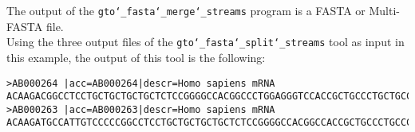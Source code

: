 The output of the \texttt{gto\char`_fasta\char`_merge\char`_streams} program is a FASTA or Multi-FASTA file.\\
Using the three output files of the \texttt{gto\char`_fasta\char`_split\char`_streams} tool as input in this example, the output of this tool is the following:
\begin{lstlisting}
>AB000264 |acc=AB000264|descr=Homo sapiens mRNA 
ACAAGACGGCCTCCTGCTGCTGCTGCTCTCCGGGGCCACGGCCCTGGAGGGTCCACCGCTGCCCTGCTGCCATTGTCCCCGGCCCCACCTAAGGAAAAGCAGCCTCCTGACTTTCCTCGCTTGGGCCGAGACAGCGAGCATATGCAGGAAGCGGCAGGAAGTGGTTTGAGTGGACCTCCGGGCCCCTCATAGGAGAGGAAGCTCGGGAGGTGGCCAGGCGGCAGGAAGCAGGCCAGTGCCGCGAATCCGCGCGCCGGGACAGAATCTCCTGCAAAGCCCTGCAGGAACTTCTTCTGGAAGACCTTCTCCACCCCCCCAGCTAAAACCTCACCCATGAATGCTCACGCAAGTTTAATTACAGACCTGAA
>AB000263 |acc=AB000263|descr=Homo sapiens mRNA 
ACAAGATGCCATTGTCCCCCGGCCTCCTGCTGCTGCTGCTCTCCGGGGCCACGGCCACCGCTGCCCTGCCCCTGGAGGGTGGCCCCACCGGCCGAGACAGCGAGCATATGCAGGAAGCGGCAGGAATAAGGAAAAGCAGCCTCCTGACTTTCCTCGCTTGGTGGTTTGAGTGGACCTCCCAGGCCAGTGCCGGGCCCCTCATAGGAGAGGAAGCTCGGGAGGTGGCCAGGCGGCAGGAAGGCGCACCCCCCCAGCAATCCGCGCGCCGGGACAGAATGCCCTGCAGGAACTTCTTCTGGAAGACCTTCTCCTCCTGCAAATAAAACCTCACCCATGAATGCTCACGCAAGTTTAATTACAGACCTGAA
\end{lstlisting}